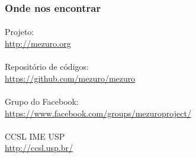 \documentclass{beamer}
\begin{document}
  \begin{frame}
    \frametitle{Onde nos encontrar}
    \framesubtitle{}
    \begin{center}
    Projeto: \\ \url{http://mezuro.org}
    \\~\\ Repositório de códigos: \\ \url{https://github.com/mezuro/mezuro}
    \\~\\ Grupo do Facebook: \\ \url{https://www.facebook.com/groups/mezuroproject/}
 \\~\\ CCSL IME USP \\ \url{http://ccsl.usp.br/}
    \end{center}
      
  \end{frame}
  
 
  

  
\end{document}
